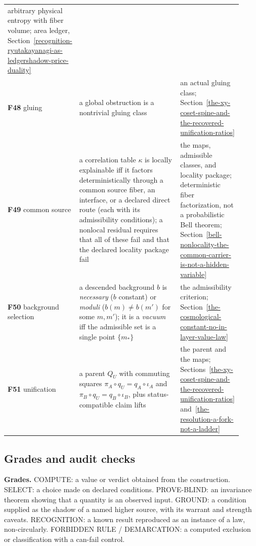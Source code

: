\documentclass[11pt]{article}
\theoremstyle{definition}
\begin{document}
\begin{center}
\begin{longtable}[]{@{}p{0.16\linewidth}p{0.48\linewidth}p{0.28\linewidth}@{}}
arbitrary physical entropy with fiber volume; area ledger, Section~\ref{recognition-ryutakayanagi-as-ledgershadow-price-duality}\\
\textbf{F48} gluing & a global obstruction is a nontrivial gluing class & an actual gluing class;
Section~\ref{the-xy-coset-spine-and-the-recovered-unification-ratios}\\
\textbf{F49} common source & a correlation table \(\kappa\) is locally explainable iff it factors deterministically
through a common source fiber, an interface, or a declared direct route (each with its admissibility conditions); a
nonlocal residual requires that all of these fail and that the declared locality package fail & the maps, admissible
classes, and locality package; deterministic fiber factorization, not a probabilistic Bell theorem; Section~\ref{bell-nonlocality-the-common-carrier-is-not-a-hidden-variable}\\
\textbf{F50} background selection & a descended background \(b\) is \emph{necessary} (\(b\) constant) or \emph{moduli}
(\(b(m)\neq b(m')\) for some \(m,m'\)); it is a \emph{vacuum} iff the admissible set is a single point \(\{m_*\}\) & the
admissibility criterion; Section~\ref{the-cosmological-constant-no-in-layer-value-law}\\
\textbf{F51} unification & a parent \(Q_U\) with commuting squares \(\pi_A\circ q_U = q_A\circ\iota_A\) and
\(\pi_B\circ q_U = q_B\circ\iota_B\), plus status-compatible claim lifts & the parent and the maps; Sections~\ref{the-xy-coset-spine-and-the-recovered-unification-ratios}
and~\ref{the-resolution-a-fork-not-a-ladder}\\
\bottomrule
\end{longtable}
\end{center}

\subsection{Grades and audit checks}\label{landing-modes-and-audit-gates-operational-definitions}

\textbf{Grades.} COMPUTE: a value or verdict obtained from the construction. SELECT: a choice made on declared
conditions. PROVE-BLIND: an invariance theorem showing that a quantity is an observed input. GROUND: a condition
supplied as the shadow of a named higher source, with its warrant and strength caveats. RECOGNITION: a known result
reproduced as an instance of a law, non-circularly. FORBIDDEN RULE / DEMARCATION: a computed exclusion or
classification with a can-fail control.
\end{document}
